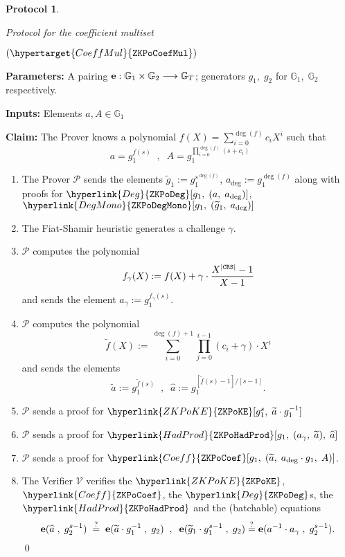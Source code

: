 \documentclass[11pt, lettersize, notitlepage, leqno, footskip=0.6cm]{article}
\newcommand{\lra}{\longrightarrow}
\newcommand{\wti}{\widetilde}
\newcommand{\mc}{\mathcal}
\newcommand{\mb}{\mathbb}
\newcommand{\mbf}{\mathbf}
\newcommand{\what}{\widehat}
\newcommand{\mP}{\mc{P}}
\newcommand{\V}{\mc{V}}
\newcommand{\vs}{\vspace{-0.15cm}}
\newcommand{\noin}{\noindent}
\newcommand{\sta}{\stackrel{?}{=}}
\newcommand{\e}{\mbf{e}}
\newtheorem{Prot}[Thm]{Protocol}
\numberwithin{equation}{section}
\begin{document}
\begin{mdframed}
\begin{Prot} \hypertarget{MulSet}{Protocol for the coefficient multiset} $(\hypertarget{CoeffMul}{\tt{ZKPoCoefMul}})$\end{Prot}  

\noin \textbf{Parameters:} A pairing ${\bf{e}}:\mb{G}_1\times \mb{G}_2\lra \mb{G}_T$; generators $g_1,\;g_2$ for $\mb{G}_1,\; \mb{G}_2$ respectively. 


\noin \textbf{Inputs:} Elements $a, A \in \mb{G}_1$

\noin \textbf{Claim:} The Prover knows a polynomial $f(X) = \sum\limits_{i=0}^{\deg(f)} c_iX^i$ such that \vs $$ a = g_1^{f(s)}\;\;,\;\;A = g_1^{\prod\limits_{i=0}^{\deg(f)} (s+c_i) } $$

\begin{enumerate}[wide, labelwidth=!, labelindent=0pt, itemsep=-0.2ex] 

\item The Prover $\mP$ sends the elements $\wti{g}_1:= g_1^{s^{\deg(f)}}$, $a_{\deg}:= g_1^{\deg(f)}$ along with proofs for $\hyperlink{Deg}{\tt{ZKPoDeg}}[g_1,\;(a,\;a_{\deg})]$, $\hyperlink{DegMono}{\tt{ZKPoDegMono}}[g_1,\;(\wti{g}_1,\;a_{\deg})]$

\item The Fiat-Shamir heuristic generates a challenge $\gamma$.

\item $\mP$ computes the polynomial \vs $$ f_{\gamma}(X):= f(X) + \gamma\cdot \frac{X^{|{\tt{CRS}}|}-1}{X-1} $$ and sends the element $a_{\gamma}:= g_1^{f_{\gamma}(s)}$.

\item $\mP$ computes the polynomial \vspace{-2mm} $$ \wti{f}(X):= \sum\limits_{i=0}^{\deg(f)+1} \prod\limits_{j=0}^{i-1} (c_i+\gamma)\cdot  X^i  $$ and sends the elements \vs $$\wti{a}:= g_1^{\wti{f}(s)}\;\;,\;\;\what{a}:= g_1^{[\wti{f}(s)-1]\big/[s-1]} .$$

\item $\mP$ sends a proof for $\hyperlink{ZKPoKE}{\tt{ZKPoKE}}[g_1^{s},\;\wti{a}\cdot g_1^{-1}] $

\item $\mP$ sends a proof for $\hyperlink{HadProd}{\tt{ZKPoHadProd}}[g_1,\;({a}_{\gamma},\;\wti{a}),\;\what{a}] $

\item $\mP$ sends a proof for $\hyperlink{Coeff}{\tt{ZKPoCoef}}[g_1,\;(\wti{a},\; a_{\deg}\cdot g_1,\; A)] $.

\item The Verifier $\V$ verifies the $\hyperlink{ZKPoKE}{\tt{ZKPoKE}}$, $\hyperlink{Coeff}{\tt{ZKPoCoef}}$, the $\hyperlink{Deg}{\tt{ZKPoDeg}}$s, the $\hyperlink{HadProd}{\tt{ZKPoHadProd}}$ and the (batchable) equations \vs $$ \e(\what{a}\;,\;g_2^{s-1})\;\sta\; \e(\wti{a}\cdot g_1^{-1}\;,\;g_2)\;\;,\;\;\e(\wti{g}_1\cdot g_1^{s-1}\;,\;g_2)\sta \e(a^{-1}\cdot a_{\gamma}\;,\;g_2^{s-1}). \vspace{-3mm} $$ \qed \end{enumerate} \end{mdframed} 
\end{document}
